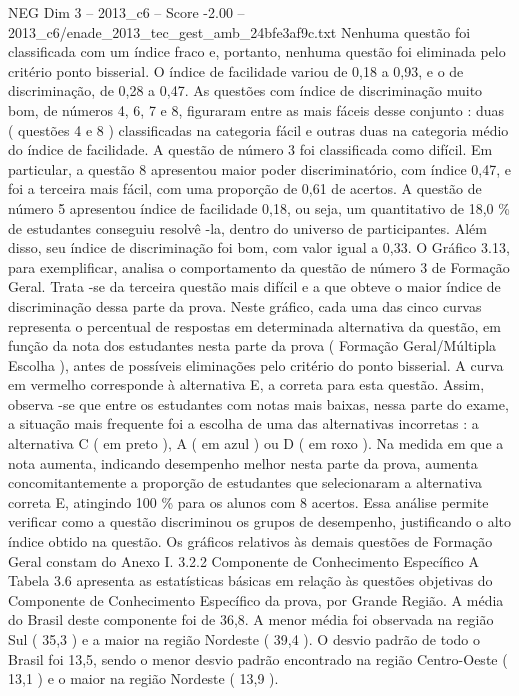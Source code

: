 \begin{textsample}{NEG Dim 3 – 2013\_c6 – Score -2.00 – 2013\_c6/enade\_2013\_tec\_gest\_amb\_24bfe3af9c.txt}
Nenhuma questão foi classificada com um índice fraco e, portanto, nenhuma questão foi eliminada pelo critério ponto bisserial.
O índice de facilidade variou de 0,18 a 0,93, e o de discriminação, de 0,28 a 0,47.
As questões com índice de discriminação muito bom, de números 4, 6, 7 e 8, figuraram entre as mais fáceis desse conjunto : duas ( questões 4 e 8 ) classificadas na categoria fácil e outras duas na categoria médio do índice de facilidade.
A questão de número 3 foi classificada como difícil.
Em particular, a questão 8 apresentou maior poder discriminatório, com índice 0,47, e foi a terceira mais fácil, com uma proporção de 0,61 de acertos.
A questão de número 5 apresentou índice de facilidade 0,18, ou seja, um quantitativo de 18,0 \% de estudantes conseguiu resolvê -la, dentro do universo de participantes.
Além disso, seu índice de discriminação foi bom, com valor igual a 0,33.
O Gráfico 3.13, para exemplificar, analisa o comportamento da questão de número 3 de Formação Geral.
Trata -se da terceira questão mais difícil e a que obteve o maior índice de discriminação dessa parte da prova.
Neste gráfico, cada uma das cinco curvas representa o percentual de respostas em determinada alternativa da questão, em função da nota dos estudantes nesta parte da prova ( Formação Geral/Múltipla Escolha ), antes de possíveis eliminações pelo critério do ponto bisserial.
A curva em vermelho corresponde à alternativa E, a correta para esta questão.
Assim, observa -se que entre os estudantes com notas mais baixas, nessa parte do exame, a situação mais frequente foi a escolha de uma das alternativas incorretas : a alternativa C ( em preto ), A ( em azul ) ou D ( em roxo ).
Na medida em que a nota aumenta, indicando desempenho melhor nesta parte da prova, aumenta concomitantemente a proporção de estudantes que selecionaram a alternativa correta E, atingindo 100 \% para os alunos com 8 acertos.
Essa análise permite verificar como a questão discriminou os grupos de desempenho, justificando o alto índice obtido na questão.
Os gráficos relativos às demais questões de Formação Geral constam do Anexo I. 3.2.2 Componente de Conhecimento Específico A Tabela 3.6 apresenta as estatísticas básicas em relação às questões objetivas do Componente de Conhecimento Específico da prova, por Grande Região.
A média do Brasil deste componente foi de 36,8.
A menor média foi observada na região Sul ( 35,3 ) e a maior na região Nordeste ( 39,4 ).
O desvio padrão de todo o Brasil foi 13,5, sendo o menor desvio padrão encontrado na região Centro-Oeste ( 13,1 ) e o maior na região Nordeste ( 13,9 ).

\end{textsample}
